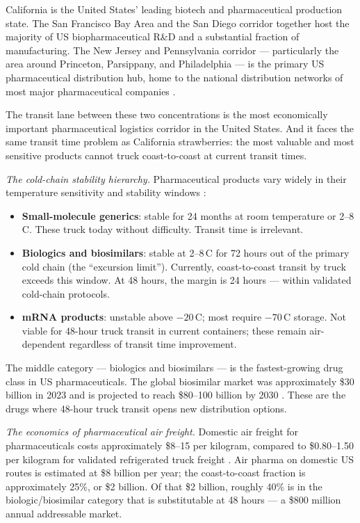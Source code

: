 California is the United States' leading biotech and pharmaceutical production state.
The San Francisco Bay Area and the San Diego corridor together host the majority of
US biopharmaceutical R\&D and a substantial fraction of manufacturing. The New Jersey
and Pennsylvania corridor --- particularly the area around Princeton, Parsippany,
and Philadelphia --- is the primary US pharmaceutical distribution hub, home to the
national distribution networks of most major pharmaceutical companies
\citep{PhRMA2023}.

The transit lane between these two concentrations is the most economically important
pharmaceutical logistics corridor in the United States. And it faces the same transit
time problem as California strawberries: the most valuable and most sensitive products
cannot truck coast-to-coast at current transit times.

\textit{The cold-chain stability hierarchy.} Pharmaceutical products vary widely in their
temperature sensitivity and stability windows \citep{PhRMA2023}:

\begin{itemize}
\item \textbf{Small-molecule generics}: stable for 24 months at room temperature or 2--8\,\textdegree C.
      These truck today without difficulty. Transit time is irrelevant.
\item \textbf{Biologics and biosimilars}: stable at 2--8\,\textdegree C for 72 hours out of the
      primary cold chain (the ``excursion limit'').
      Currently, coast-to-coast transit by truck exceeds this window.
      At 48 hours, the margin is 24 hours --- within validated cold-chain protocols.
\item \textbf{mRNA products}: unstable above $-20$\,\textdegree C; most require $-70$\,\textdegree C
      storage. Not viable for 48-hour truck transit in current containers;
      these remain air-dependent regardless of transit time improvement.
\end{itemize}

The middle category --- biologics and biosimilars --- is the fastest-growing drug class
in US pharmaceuticals. The global biosimilar market was approximately \$30 billion in
2023 and is projected to reach \$80--100 billion by 2030 \citep{PhRMA2023}. These are
the drugs where 48-hour truck transit opens new distribution options.

\textit{The economics of pharmaceutical air freight.} Domestic air freight for
pharmaceuticals costs approximately \$8--15 per kilogram, compared to \$0.80--1.50
per kilogram for validated refrigerated truck freight \citep{BTS_airfreight2023,FHWA_freight2023}.
Air pharma on domestic US routes is estimated at \$8 billion per year; the coast-to-coast
fraction is approximately 25\%, or \$2 billion. Of that \$2 billion, roughly
40\% is in the biologic/biosimilar category that is substitutable at 48 hours --- a
\$800 million annual addressable market.

